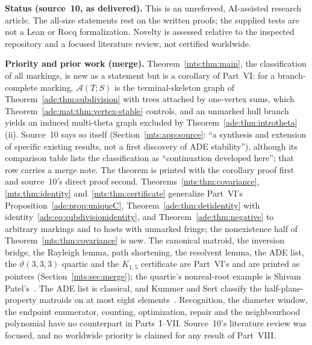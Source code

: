 \documentclass[11pt]{article}
\numberwithin{equation}{section}
\theoremstyle{definition}
\newcommand{\calA}{\mathcal A}
\begin{document}
\begin{statusbox}
\small\textbf{Status (source~10, as delivered).} This is an unrefereed,
AI-assisted research article. The all-size statements rest on the written
proofs; the supplied tests are not a Lean or Rocq formalization. Novelty is
assessed relative to the inspected repository and a focused literature
review, not certified worldwide.
\end{statusbox}

\begin{statusbox}
\small\textbf{Priority and prior work (merge).}
Theorem~\ref{mts:thm:main}, the classification of all markings, is new as a
statement but is a corollary of Part~VI: for a branch-complete marking,
$\calA(T;S)$ is the terminal-skeleton graph of
Theorem~\ref{ade:thm:subdivision} with trees attached by one-vertex sums,
which Theorem~\ref{ade:mat:thm:vertex-stable} controls, and an unmarked hull
branch yields an induced multi-theta graph excluded by
Theorem~\ref{ade:thm:introtheta}(ii). Source~10 says so itself
(Section~\ref{mts:app:source}: ``a synthesis and extension of specific
existing results, not a first discovery of ADE stability''), although its
comparison table lists the classification as ``continuation developed
here''; that row carries a merge note. The theorem is printed with the
corollary proof first and source~10's direct proof second.
Theorems~\ref{mts:thm:covariance}, \ref{mts:thm:identity}
and~\ref{mts:thm:certificate} generalize Part~VI's
Proposition~\ref{ade:prop:uniqueC}, Theorem~\ref{ade:thm:detidentity} with
identity~\eqref{ade:eq:subdivisionidentity}, and
Theorem~\ref{ade:thm:negative} to arbitrary markings and to hosts with
unmarked fringe; the nonexistence half of Theorem~\ref{mts:thm:covariance}
is new. The canonical matroid, the inversion bridge, the Rayleigh lemma,
path shortening, the resolvent lemma, the ADE list, the $\vartheta(3,3,3)$
quartic and the $K_{1,5}$ certificate are Part~VI's and are printed as
pointers (Section~\ref{mts:sec:merge}); the quartic's nonreal-root example
is Shivam Patel's~\cite{Patel}. The ADE list is classical, and Kummer and
Sert classify the half-plane-property matroids on at most eight
elements~\cite{KummerSert}. Recognition, the diameter window, the endpoint
enumerator, counting, optimization, repair and the neighbourhood polynomial
have no counterpart in Parts~I--VII. Source~10's literature review was
focused, and no worldwide priority is claimed for any result of
Part~VIII.
\end{statusbox}
\end{document}
